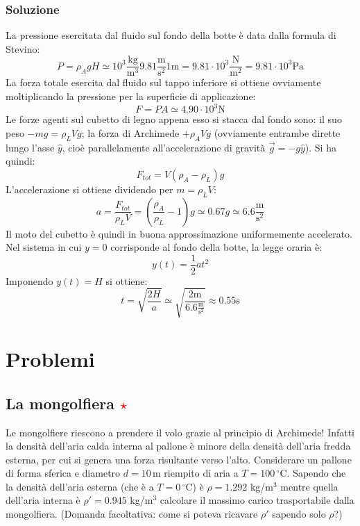 \documentclass[12pt,a4paper]{book}
\newcommand{\rstar}{ \textcolor{red}{$\star$}}
\begin{document}
\subsubsection*{Soluzione}
La pressione esercitata dal fluido sul fondo della botte è data dalla formula di Stevino:
\begin{equation*}
P=\rho_A g H\simeq10^3 \frac{\text{kg}}{\text{m}^3} 9.81\frac{\text{m}}{\text{s}^2}  1 \text{m} = 9.81 \cdot 10^3  \frac{\text{N}}{\text{m}^2}=9.81 \cdot 10^3 \text{Pa}
\end{equation*}
La forza totale esercita dal fluido sul tappo inferiore si ottiene ovviamente moltiplicando la pressione per la superficie di applicazione:
\begin{equation*}
F=PA\simeq 4.90 \cdot 10^3 \text{N}
\end{equation*}
Le forze agenti sul cubetto di legno appena esso si stacca dal fondo sono: il suo peso $-mg=\rho_L V g$; la forza di Archimede $+\rho_A V g$ (ovviamente entrambe dirette lungo l'asse $\hat{y}$, cioè parallelamente all'accelerazione di gravità $\vec{g}=-g \hat{y}$). Si ha quindi:
\begin{equation*}
F_{tot}=V (\rho_A-\rho_L )g
\end{equation*}
L'accelerazione si ottiene dividendo per $m=\rho_L V$:
\begin{equation*}
a=\frac{F_{tot}}{\rho_L V}= (\frac{\rho_A}{\rho_L}-1 )g \simeq 0.67 g \simeq 6.6 \frac{\text{m}}{\text{s}^2}
\end{equation*}
Il moto del cubetto è quindi in buona approssimazione uniformemente accelerato. Nel sistema in cui $y=0$ corrisponde al fondo
della botte, la legge oraria è:
\begin{equation*}
y(t)=\frac{1}{2} a t^2 
\end{equation*}
Imponendo $y(t)=H$ si ottiene:
\begin{equation*}
t = \sqrt{\frac{2 H}{a}} \simeq \sqrt{\frac{2 \text{m}}{6.6 \frac{\text{m}}{\text{s}^2}}} \approx 0.55 \text{s}
\end{equation*}

\section{Problemi}

\subsection{La mongolfiera \rstar}
Le mongolfiere riescono a prendere il volo grazie al principio di Archimede! Infatti la densità dell'aria 
calda interna al pallone è minore della densità dell'aria fredda esterna, per cui si genera una forza risultante
verso l'alto. Considerare un pallone di forma sferica e diametro $d=10\,$m riempito di aria a $T=100 \,^{\circ}$C.
Sapendo che la densità dell'aria esterna (che è a $T=0 \,^{\circ}$C) è $\rho=1.292$ kg/m$^3$
mentre quella dell'aria interna è $\rho'=0.945$ kg/m$^3$ calcolare il massimo carico trasportabile
dalla mongolfiera. (Domanda facoltativa: come si poteva ricavare $\rho'$ sapendo solo $\rho$?)
\end{document}
